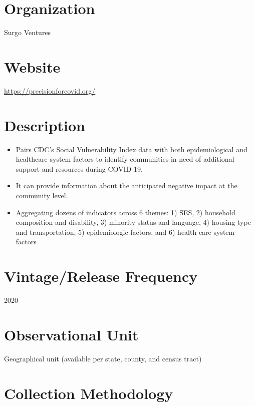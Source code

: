 \documentclass[
]{book}
\providecommand{\tightlist}{%
  \setlength{\itemsep}{0pt}\setlength{\parskip}{0pt}}
\begin{document}
\hypertarget{organization-21}{%
\section{Organization}\label{organization-21}}

Surgo Ventures

\hypertarget{website-21}{%
\section{Website}\label{website-21}}

\url{https://precisionforcovid.org/}

\hypertarget{description-21}{%
\section{Description}\label{description-21}}

\begin{itemize}
\tightlist
\item
  Pairs CDC's Social Vulnerability Index data with both epidemiological and healthcare system factors to identify communities in need of additional support and resources during COVID-19.
\item
  It can provide information about the anticipated negative impact at the community level.
\item
  Aggregating dozens of indicators across 6 themes: 1) SES, 2) household composition and disability, 3) minority status and language, 4) housing type and transportation, 5) epidemiologic factors, and 6) health care system factors
\end{itemize}

\hypertarget{vintagerelease-frequency-21}{%
\section{Vintage/Release Frequency}\label{vintagerelease-frequency-21}}

2020

\hypertarget{observational-unit-21}{%
\section{Observational Unit}\label{observational-unit-21}}

Geographical unit (available per state, county, and census tract)

\hypertarget{collection-methodology-21}{%
\section{Collection Methodology}\label{collection-methodology-21}}
\end{document}

